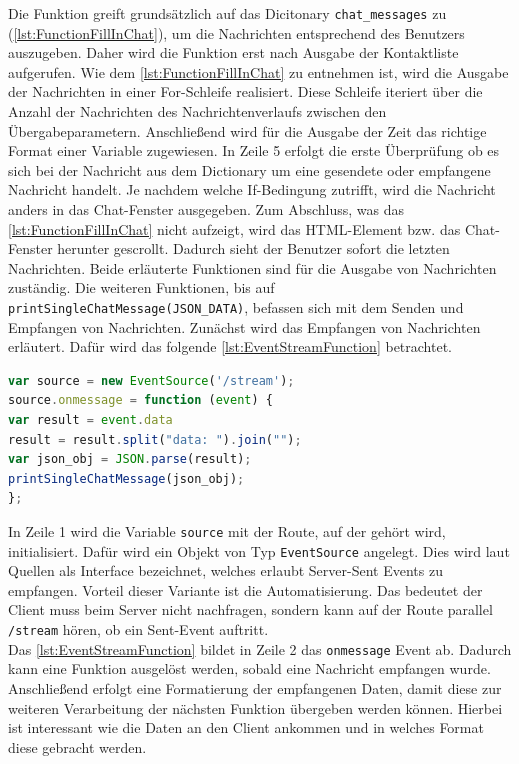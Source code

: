 \documentclass[a4paper,titlepage,halfparskip,12pt]{scrreprt}
\begin{document}
\begin{onehalfspacing}
Die Funktion greift grundsätzlich auf das Dicitonary \texttt{chat\_messages} zu (\autoref{lst:FunctionFillInChat}), um die Nachrichten entsprechend des Benutzers auszugeben. Daher wird die Funktion erst nach Ausgabe der Kontaktliste aufgerufen. Wie dem \autoref{lst:FunctionFillInChat} zu entnehmen ist, wird die Ausgabe der Nachrichten in einer For-Schleife realisiert. Diese Schleife iteriert über die Anzahl der Nachrichten des Nachrichtenverlaufs zwischen den Übergabeparametern. Anschließend wird für die Ausgabe der Zeit das richtige Format einer Variable zugewiesen. In Zeile 5 erfolgt die erste Überprüfung ob es sich bei der Nachricht aus dem Dictionary um eine gesendete oder empfangene Nachricht handelt. Je nachdem welche If-Bedingung zutrifft, wird die Nachricht anders in das Chat-Fenster ausgegeben. Zum Abschluss, was das \autoref{lst:FunctionFillInChat} nicht aufzeigt, wird das \ac{HTML}-Element bzw. das Chat-Fenster herunter gescrollt. Dadurch sieht der Benutzer sofort die letzten Nachrichten. Beide erläuterte Funktionen sind für die Ausgabe von Nachrichten zuständig. Die weiteren Funktionen, bis auf \texttt{printSingleChatMessage\linebreak(JSON\_DATA)}, befassen sich mit dem Senden und Empfangen von Nachrichten. Zunächst wird das Empfangen von Nachrichten erläutert. Dafür wird das folgende \autoref{lst:EventStreamFunction} betrachtet.
\begin{lstlisting}[language=Javascript,caption=Öffnen des Eventstreams um Nachrichten zu empfangen ,label={lst:EventStreamFunction}]
var source = new EventSource('/stream');
source.onmessage = function (event) {
var result = event.data
result = result.split("data: ").join("");
var json_obj = JSON.parse(result);
printSingleChatMessage(json_obj);
};
\end{lstlisting}
In Zeile 1 wird die Variable \texttt{source} mit der Route, auf der gehört wird, initialisiert. Dafür wird ein Objekt von Typ \texttt{EventSource} angelegt. Dies wird laut Quellen als Interface bezeichnet, welches erlaubt Server-Sent Events zu empfangen. Vorteil dieser Variante ist die Automatisierung. Das bedeutet der Client muss beim Server nicht nachfragen, sondern kann auf der Route parallel \texttt{/stream} hören, ob ein Sent-Event auftritt.\cite{w3schoolsServerSentEvent}\\
Das \autoref{lst:EventStreamFunction} bildet in Zeile 2 das \texttt{onmessage} Event ab. Dadurch kann eine Funktion ausgelöst werden, sobald eine Nachricht empfangen wurde. Anschließend erfolgt eine Formatierung der empfangenen Daten, damit diese zur weiteren Verarbeitung der nächsten Funktion übergeben werden können. Hierbei ist interessant wie die Daten an den Client ankommen und in welches Format diese gebracht werden.

\end{onehalfspacing}
\end{document}
